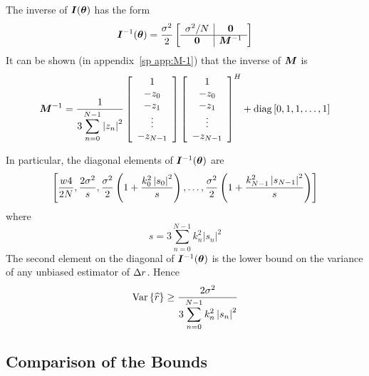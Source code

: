 The inverse of $\bm{I}(\bm{\theta})$ has the form
\begin{equation}
\bm{I}^{-1}(\bm{\theta})=\frac{{\sigma^2}}{2}\left[\begin{array}{c|c}
{\sigma^2}/N & \bm{0} \\
\hline
\bm{0} & \bm{M}^{-1}
\end{array}\right]
\end{equation}
It can be shown (in appendix~\ref{sp app:M-1}) that the inverse of $\bm{M}$ 
is
\begin{equation}
\bm{M}^{-1}=\frac{1}{3\displaystyle\sum_{n=0}^{N-1}\left|z_n\right|^2}
\left[\begin{array}{c} 1 \\ -z_0 \\ -z_1\\ 
\vdots \\ -z_{N-1} \end{array}\right]
\left[\begin{array}{c} 1 \\ -z_0 \\ -z_1\\ 
\vdots \\ -z_{N-1} \end{array}\right]^{H}
+\mathop{\rm diag}\left[0, 1, 1, \ldots, 1\right]
\end{equation}

In particular, the diagonal elements of $\bm{I}^{-1}(\bm{\theta})$ are
\begin{equation}
\left[
\frac{{w}{4}}{2N}, \frac{2{\sigma^2}}{s},
\frac{{\sigma^2}}{2}\left(1+\frac{k_0^2\left|s_0\right|^2}{s}\right),
\ldots,\frac{{\sigma^2}}{2}\left(1+\frac{k_{N-1}^2\left|s_{N-1}\right|^2}{s}\right)
\right]
\end{equation}
where 
\begin{equation}
s=3\sum_{n=0}^{N-1}k_n^2\left|s_n\right|^2
\end{equation}
The second element on the diagonal of $\bm{I}^{-1}(\bm{\theta})$ is the \CR lower
bound on the variance of any unbiased estimator of ${\Delta r}$.  Hence
\begin{equation}
{\mathop{\rm Var}\nolimits\left\{\widehat{r}\right\}}\geq\frac{2{\sigma^2}}{3\displaystyle\sum_{n=0}^{N-1}k_n^2\left|s_n\right|^2}
\end{equation}

\subsection{Comparison of the \CR Bounds}

